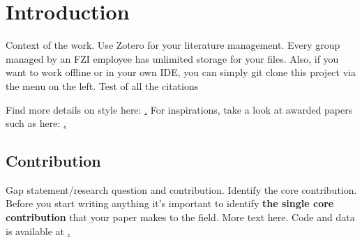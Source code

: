 \section{Introduction}
\label{sec:introduction}

Context of the work. Use Zotero for your literature management. Every group managed by an FZI employee has unlimited storage for your files. Also, if you want to work offline or in your own IDE, you can simply git clone this project via the menu on the left. Test of all the citations
\cite{Bogdoll_Compressing_2021_NeurIPS}
\cite{Bogdoll_Description_2021_ICCV}
\cite{Bogdoll_KIGLIS_2021_ISC2}
\cite{Bogdoll_Taxonomy_2021_arXiv}
\cite{Toettel_Reliving_2021_arXiv}
\cite{Reichert_Towards_2021_ISC2}
\cite{Koduri_Aureate_2018_WCX}
\cite{Asam_Openscenario_2020_Web}

Find more details on style here: \href{https://github.com/daniel-bogdoll/ConferenceTemplate/blob/main/README.md}. For inspirations, take a look at awarded papers such as here: \href{https://cvpr2021.thecvf.com/node/329}.

\subsection{Contribution}
Gap statement/research question and contribution. Identify the core contribution. Before you start writing anything it’s important to identify \textbf{the single core contribution} that your paper makes to the field. More text here. Code and data is
available at \href{https://github.com/xxxxx}.

